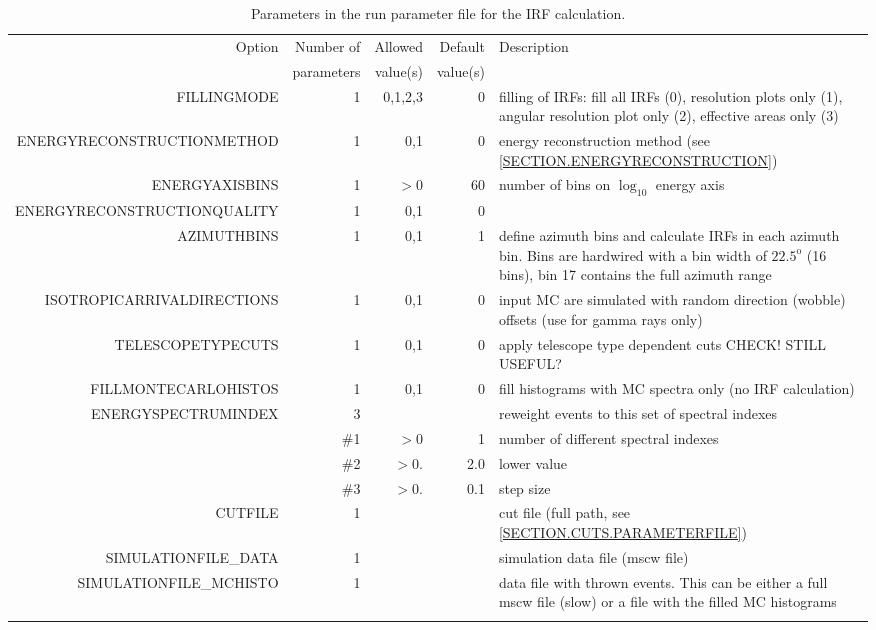 \documentclass[titlepage,a4paper,twoside,11pt]{report}
\begin{document}
\begin{small}
\begin{longtable}{r  r  r r  p{3.5cm}}
\toprule
\hfill
Option & Number of & Allowed & Default & Description  \\
             & parameters & value(s) & value(s) & \\
\midrule
\midrule
FILLINGMODE  & 1 & 0,1,2,3 & 0 & filling of IRFs: fill all IRFs (0), resolution plots only (1), angular resolution plot only (2), effective areas only (3) \\

ENERGYRECONSTRUCTIONMETHOD & 1 & 0,1 & 0 &  energy reconstruction method (see \ref{SECTION.ENERGYRECONSTRUCTION}) \\

ENERGYAXISBINS & 1 & $>0$ & 60 & number of bins on $\log_{10}$ energy axis \\

ENERGYRECONSTRUCTIONQUALITY & 1 & 0,1 & 0 &  \\

AZIMUTHBINS & 1 & 0,1 & 1 & define azimuth bins and calculate IRFs in each azimuth bin. Bins are hardwired with a bin width of $22.5^{\mathrm{o}}$ (16 bins), bin 17 contains the full azimuth range \\

ISOTROPICARRIVALDIRECTIONS & 1 & 0,1 & 0 & input MC are simulated with random direction (wobble) offsets (use for gamma rays only) \\

TELESCOPETYPECUTS & 1 & 0,1 & 0 & apply telescope type dependent cuts {\color{red} CHECK! STILL USEFUL?}\\

FILLMONTECARLOHISTOS & 1 & 0,1 & 0 & fill histograms with MC spectra only (no IRF calculation) \\

ENERGYSPECTRUMINDEX  & 3 &  &  & reweight events to this set of spectral indexes \\
& \#1 & $>0$ & 1 & number of different spectral indexes \\
& \#2 & $>0.$ & 2.0 & lower value \\ 
& \#3 & $>0.$ & 0.1 & step size \\

CUTFILE & 1 & & & cut file (full path, see \ref{SECTION.CUTS.PARAMETERFILE}) \\

SIMULATIONFILE\_DATA & 1  & & & simulation data file (mscw file) \\

SIMULATIONFILE\_MCHISTO  & 1  & & & data file with thrown events. This can be either a full mscw file (slow) or a file with the filled MC histograms \\

\bottomrule
\caption{Parameters in the run parameter file for the IRF calculation.}
\end{longtable}
\end{small}
\end{document}
